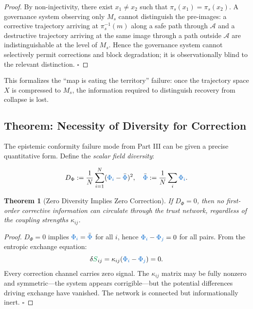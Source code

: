 \documentclass[11pt,a4paper]{article}
\newcommand{\scalar}[1]{\textcolor{scalarcolor}{\ensuremath{#1}}}
\newcommand{\entropy}[1]{\textcolor{entropycolor}{\ensuremath{#1}}}
\theoremstyle{definition}
\theoremstyle{plain}
\newtheorem{theorem}{Theorem}
\begin{document}
\begin{mdframed}[style=appendixbox]
\begin{proof}
By non-injectivity, there exist $x_1 \neq x_2$ such that $\pi_s(x_1) = \pi_s(x_2)$. A governance system observing only $M_s$ cannot distinguish the pre-images: a corrective trajectory arriving at $\pi_s^{-1}(m)$ along a safe path through $\mathcal{A}$ and a destructive trajectory arriving at the same image through a path outside $\mathcal{A}$ are indistinguishable at the level of $M_s$. Hence the governance system cannot selectively permit corrections and block degradation; it is observationally blind to the relevant distinction. $\square$
\end{proof}

This formalizes the ``map is eating the territory'' failure: once the trajectory space $X$ is compressed to $M_s$, the information required to distinguish recovery from collapse is lost.

\subsection{Theorem: Necessity of Diversity for Correction}

The epistemic conformity failure mode from Part III can be given a precise quantitative form. Define the \emph{scalar field diversity}:

\begin{equation}
D_\Phi := \frac{1}{N}\sum_{i=1}^N (\scalar{\Phi_i} - \bar{\scalar{\Phi}})^2, \quad \bar{\scalar{\Phi}} := \frac{1}{N}\sum_i \scalar{\Phi_i}.
\end{equation}

\begin{theorem}[Zero Diversity Implies Zero Correction]
If $D_\Phi = 0$, then no first-order corrective information can circulate through the trust network, regardless of the coupling strengths $\kappa_{ij}$.
\end{theorem}

\begin{proof}
$D_\Phi = 0$ implies $\scalar{\Phi_i} = \bar{\scalar{\Phi}}$ for all $i$, hence $\scalar{\Phi_i} - \scalar{\Phi_j} = 0$ for all pairs. From the entropic exchange equation:
\[
\delta\entropy{S}_{ij} = \kappa_{ij}(\scalar{\Phi_i} - \scalar{\Phi_j}) = 0.
\]
Every correction channel carries zero signal. The $\kappa_{ij}$ matrix may be fully nonzero and symmetric---the system appears corrigible---but the potential differences driving exchange have vanished. The network is connected but informationally inert. $\square$
\end{proof}


\end{mdframed}
\end{document}
